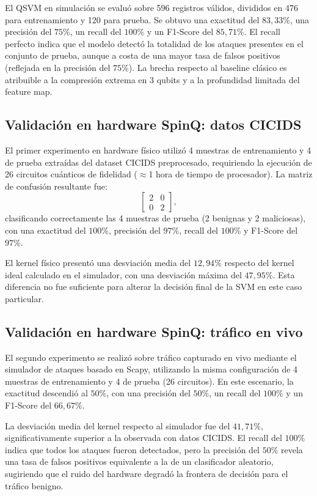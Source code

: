 \documentclass[10pt,conference]{IEEEtran}
\begin{document}
El QSVM en simulación se evaluó sobre 596 registros válidos, divididos
en 476 para entrenamiento y 120 para prueba. Se obtuvo una exactitud
del $83{,}33\%$, una precisión del $75\%$, un recall del $100\%$ y un
F1-Score del $85{,}71\%$. El recall perfecto indica que el modelo
detectó la totalidad de los ataques presentes en el conjunto de prueba,
aunque a costa de una mayor tasa de falsos positivos (reflejada en la
precisión del $75\%$). La brecha respecto al baseline clásico es
atribuible a la compresión extrema en 3 qubits y a la profundidad
limitada del feature map.

\subsection{Validación en hardware SpinQ: datos CICIDS}
El primer experimento en hardware físico utilizó 4 muestras de
entrenamiento y 4 de prueba extraídas del dataset CICIDS preprocesado,
requiriendo la ejecución de 26 circuitos cuánticos de fidelidad
($\approx$1 hora de tiempo de procesador). La matriz de confusión
resultante fue:
\begin{equation}
  \begin{bmatrix} 2 & 0 \\ 0 & 2 \end{bmatrix},
\end{equation}
clasificando correctamente las 4 muestras de prueba (2 benignas y 2
maliciosas), con una exactitud del $100\%$, precisión del $97\%$, recall
del $100\%$ y F1-Score del $97\%$.

El kernel físico presentó una desviación media del $12{,}94\%$ respecto
del kernel ideal calculado en el simulador, con una desviación máxima
del $47{,}95\%$. Esta diferencia no fue suficiente para alterar la
decisión final de la SVM en este caso particular.

\subsection{Validación en hardware SpinQ: tráfico en vivo}
El segundo experimento se realizó sobre tráfico capturado en vivo
mediante el simulador de ataques basado en Scapy, utilizando la misma
configuración de 4 muestras de entrenamiento y 4 de prueba (26
circuitos). En este escenario, la exactitud descendió al $50\%$, con una
precisión del $50\%$, un recall del $100\%$ y un F1-Score del $66{,}67\%$.

La desviación media del kernel respecto al simulador fue del $41{,}71\%$,
significativamente superior a la observada con datos CICIDS. El recall
del $100\%$ indica que todos los ataques fueron detectados, pero la
precisión del $50\%$ revela una tasa de falsos positivos equivalente a
la de un clasificador aleatorio, sugiriendo que el ruido del hardware
degradó la frontera de decisión para el tráfico benigno.
\end{document}
